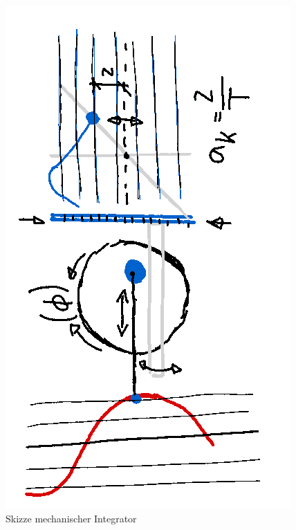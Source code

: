 \begin{figure}
	\centering
	\includegraphics[width=\textwidth]{"papers/gezeiten/Skizze Integralmaschine"}
	\caption{Skizze mechanischer Integrator
	\label{fig:skizze-integralmaschine}}
\end{figure}
